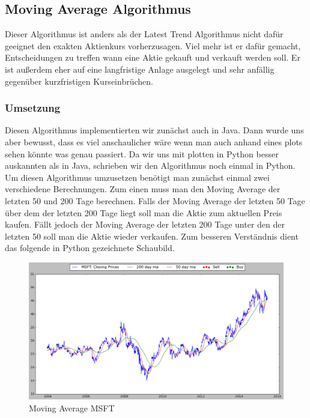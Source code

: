\documentclass[12pt]{article} %
\begin{document}

\subsection{Moving Average Algorithmus}

Dieser Algorithmus ist anders als der Latest Trend Algorithmus nicht dafür geeignet den exakten Aktienkurs vorherzusagen. Viel mehr ist er dafür gemacht, Entscheidungen zu treffen wann eine Aktie gekauft und verkauft werden soll. Er ist außerdem eher auf eine langfristige Anlage ausgelegt und sehr anfällig gegenüber kurzfristigen Kurseinbrüchen.

\subsubsection{Umsetzung}

Diesen Algorithmus implementierten wir zunächst auch in Java. Dann wurde uns aber bewusst, dass es viel anschaulicher wäre wenn man auch anhand eines plots sehen könnte was genau passiert. Da wir uns mit plotten in Python besser auskannten als in Java, schrieben wir den Algorithmus noch einmal in Python.
Um diesen Algorithmus umzusetzen benötigt man zunächst einmal zwei verschiedene Berechnungen. Zum einen muss man den Moving Average der letzten 50 und 200 Tage berechnen. Falls der Moving Average der letzten 50 Tage über dem der letzten 200 Tage liegt soll man die Aktie zum aktuellen Preis kaufen. Fällt jedoch der Moving Average der letzten 200 Tage unter den der letzten 50 soll man die Aktie wieder verkaufen. Zum besseren Verständnis dient das folgende in Python gezeichnete Schaubild.

\begin{figure}[!h]  
  \begin{center}
    \includegraphics[width=\textwidth]{MSFT_BIG}
  \end{center}
      \caption{Moving Average MSFT}
\end{figure}
\end{document}

